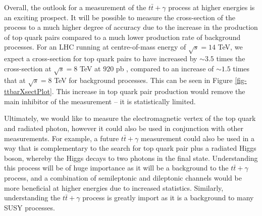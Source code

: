 Overall, the outlook for a measurement of the $t\bar{t}+\gamma$ process at higher energies is an exciting prospect. It will be possible to measure the cross-section of the process to a much higher degree of accuracy due to the increase in the production of top quark pairs compared to a much lower production rate of background processes. For an LHC running at centre-of-mass energy of $\sqrt{s} = 14$ TeV, we expect a cross-section for top quark pairs to have increased by $\sim3.5$ times the cross-section at $\sqrt{s} = 8$ TeV at $920$ pb \cite{Czakon:2013goa}, compared to an increase of $\sim1.5$ times that at $\sqrt{s} = 8$ TeV for background processes. This can be seen in Figure \ref{fig-ttbarXsectPlot}. This increase in top quark pair production would remove the main inhibitor of the measurement -- it is statistically limited.

Ultimately, we would like to measure the electromagnetic vertex of the top quark and radiated photon, however it could also be used in conjunction with other measurements. For example, a future $t\bar{t}+\gamma$ measurement could also be used in a way that is complementary to the search for top quark pair plus a radiated Higgs boson, whereby the Higgs decays to two photons in the final state. Understanding this process will be of huge importance as it will be a background to the $t\bar{t}+\gamma$ process, and a combination of semileptonic and dileptonic channels would be more beneficial at higher energies due to increased statistics. Similarly, understanding the $t\bar{t}+\gamma$ process is greatly import as it is a background to many SUSY processes. 
